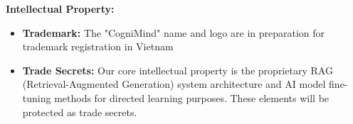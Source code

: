 \textbf{Intellectual Property:}
\begin{itemize}
    \item \textbf{Trademark:}
        The "CogniMind" name and logo are in preparation for trademark registration in Vietnam
    \item \textbf{Trade Secrets:}
        Our core intellectual property is the proprietary RAG (Retrieval-Augmented Generation) system architecture and
        AI model fine-tuning methods for directed learning purposes. These elements will be protected as trade secrets.
\end{itemize}